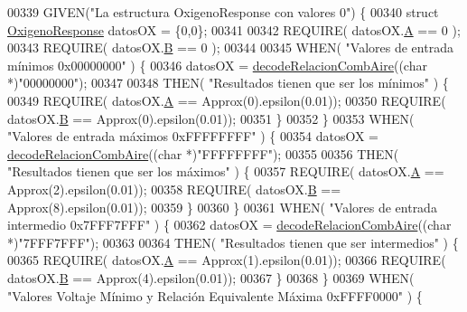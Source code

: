 \begin{DoxyCode}
{00339     GIVEN(\textcolor{stringliteral}{"La estructura OxigenoResponse con valores 0"}) \{
00340         \textcolor{keyword}{struct }\hyperlink{structOxigenoResponse}{OxigenoResponse} datosOX = \{0,0\};
00341 
00342         REQUIRE( datosOX.\hyperlink{structOxigenoResponse_a068c403e5746226cf22bb020b4c786d3}{A} == 0 );
00343         REQUIRE( datosOX.\hyperlink{structOxigenoResponse_a96b19152dd001e19d1351e2d97f22736}{B} == 0 );
00344 
00345         WHEN( \textcolor{stringliteral}{"Valores de entrada mínimos 0x00000000"} ) \{
00346             datosOX = \hyperlink{decoders_8cpp_a363bd4f505969098be58a175f02b9b50}{decodeRelacionCombAire}((\textcolor{keywordtype}{char} *)\textcolor{stringliteral}{"00000000"});
00347 
00348             THEN( \textcolor{stringliteral}{"Resultados tienen que ser los mínimos"} ) \{
00349                 REQUIRE( datosOX.\hyperlink{structOxigenoResponse_a068c403e5746226cf22bb020b4c786d3}{A} == Approx(0).epsilon(0.01));
00350                 REQUIRE( datosOX.\hyperlink{structOxigenoResponse_a96b19152dd001e19d1351e2d97f22736}{B} == Approx(0).epsilon(0.01));
00351             \}
00352         \}
00353         WHEN( \textcolor{stringliteral}{"Valores de entrada máximos 0xFFFFFFFF"} ) \{
00354             datosOX = \hyperlink{decoders_8cpp_a363bd4f505969098be58a175f02b9b50}{decodeRelacionCombAire}((\textcolor{keywordtype}{char} *)\textcolor{stringliteral}{"FFFFFFFF"});
00355 
00356             THEN( \textcolor{stringliteral}{"Resultados tienen que ser los máximos"} ) \{
00357                 REQUIRE( datosOX.\hyperlink{structOxigenoResponse_a068c403e5746226cf22bb020b4c786d3}{A} == Approx(2).epsilon(0.01));
00358                 REQUIRE( datosOX.\hyperlink{structOxigenoResponse_a96b19152dd001e19d1351e2d97f22736}{B} == Approx(8).epsilon(0.01));
00359             \}
00360         \}
00361         WHEN( \textcolor{stringliteral}{"Valores de entrada intermedio 0x7FFF7FFF"} ) \{
00362             datosOX = \hyperlink{decoders_8cpp_a363bd4f505969098be58a175f02b9b50}{decodeRelacionCombAire}((\textcolor{keywordtype}{char} *)\textcolor{stringliteral}{"7FFF7FFF"});
00363 
00364             THEN( \textcolor{stringliteral}{"Resultados tienen que ser intermedios"} ) \{
00365                 REQUIRE( datosOX.\hyperlink{structOxigenoResponse_a068c403e5746226cf22bb020b4c786d3}{A} == Approx(1).epsilon(0.01));
00366                 REQUIRE( datosOX.\hyperlink{structOxigenoResponse_a96b19152dd001e19d1351e2d97f22736}{B} == Approx(4).epsilon(0.01));
00367             \}
00368         \}
00369         WHEN( \textcolor{stringliteral}{"Valores Voltaje Mínimo y Relación Equivalente Máxima 0xFFFF0000"} ) \{
}
\end{DoxyCode}
